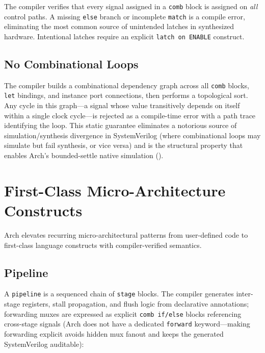 \documentclass[11pt,twocolumn]{article}
\begin{document}
The compiler verifies that every signal assigned in a \texttt{comb} block is assigned on \emph{all} control paths. A missing \texttt{else} branch or incomplete \texttt{match} is a compile error, eliminating the most common source of unintended latches in synthesized hardware. Intentional latches require an explicit \texttt{latch on ENABLE} construct.

\subsection{No Combinational Loops}

The compiler builds a combinational dependency graph across all \texttt{comb} blocks, \texttt{let} bindings, and instance port connections, then performs a topological sort. Any cycle in this graph---a signal whose value transitively depends on itself within a single clock cycle---is rejected as a compile-time error with a path trace identifying the loop. This static guarantee eliminates a notorious source of simulation/synthesis divergence in SystemVerilog (where combinational loops may simulate but fail synthesis, or vice versa) and is the structural property that enables Arch's bounded-settle native simulation ().

\section{First-Class Micro-Architecture Constructs}\label{sec:constructs}

Arch elevates recurring micro-architectural patterns from user-defined code to first-class language constructs with compiler-verified semantics.

\subsection{Pipeline}

A \texttt{pipeline} is a sequenced chain of \texttt{stage} blocks. The compiler generates inter-stage registers, stall propagation, and flush logic from declarative annotations; forwarding muxes are expressed as explicit \texttt{comb if/else} blocks referencing cross-stage signals (Arch does not have a dedicated \texttt{forward} keyword---making forwarding explicit avoids hidden mux fanout and keeps the generated SystemVerilog auditable):
\end{document}
